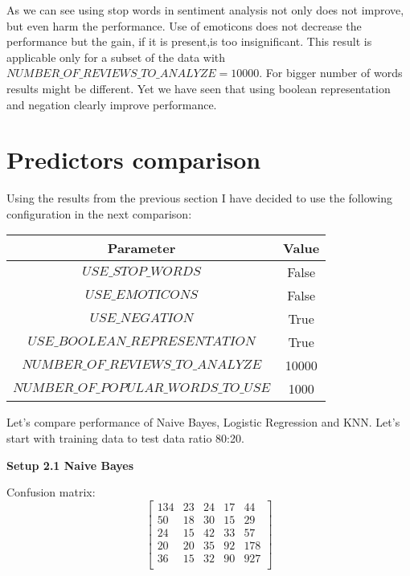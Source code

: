 \documentclass[12pt]{report}
\begin{document}
As we can see using stop words in sentiment analysis not only does not improve, but even harm the performance. Use of emoticons does not decrease the performance but the gain, if it is present,is too insignificant.
This result is applicable only for a subset of the data with $NUMBER\_OF\_REVIEWS\_TO\_ANALYZE = 10000$. For bigger number of words results might be different. Yet we have seen that using boolean representation and negation clearly improve performance.

\newpage


\section{Predictors comparison}

Using the results from the previous section I have decided to use the following configuration in the next comparison:

\begin{center}
	\begin{tabular}{ c | c }
		\hline
		Parameter & Value \\ \hline
		$USE\_STOP\_WORDS$ & False \\ \hline
		$USE\_EMOTICONS$ & False \\ \hline
		$USE\_NEGATION$ & True \\ \hline
		$USE\_BOOLEAN\_REPRESENTATION$ & True \\ \hline
		$NUMBER\_OF\_REVIEWS\_TO\_ANALYZE$ & 10000 \\ \hline
		$NUMBER\_OF\_POPULAR\_WORDS\_TO\_USE$ & 1000 \\ \hline
	\end{tabular}
\end{center}

Let’s compare performance of Naive Bayes, Logistic Regression and KNN.
Let's start with training data to test data ratio 80:20.

\bigbreak

\textbf{Setup 2.1 Naive Bayes}

Confusion matrix:
\[
\begin{bmatrix}
134 & 23 & 24 & 17 & 44 \\
50 & 18 & 30 & 15 & 29 \\
24 & 15 & 42 & 33 & 57 \\
20 & 20 & 35 & 92 & 178 \\
36 & 15 & 32 & 90 & 927 \\
\end{bmatrix}
\]
\end{document}
